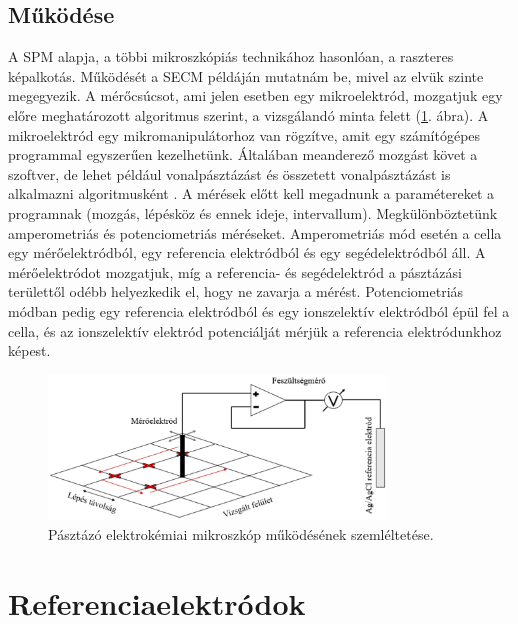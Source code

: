 \subsection{Működése}

A SPM alapja, a többi mikroszkópiás technikához hasonlóan, a raszteres képalkotás. Működését a SECM példáján mutatnám be, mivel az elvük szinte megegyezik. A mérőcsúcsot, ami jelen esetben egy mikroelektród, mozgatjuk egy előre meghatározott algoritmus szerint, a vizsgálandó minta felett (\ref{fig:PEKM}. ábra). A mikroelektród egy mikromanipulátorhoz van rögzítve, amit egy számítógépes programmal egyszerűen kezelhetünk. Általában meanderező mozgást követ a szoftver, de lehet például vonalpásztázást és összetett vonalpásztázást is alkalmazni algoritmusként \cite{kiss2014new}. A mérések előtt kell megadnunk a paramétereket a programnak (mozgás, lépésköz és ennek ideje, intervallum). Megkülönböztetünk amperometriás és potenciometriás méréseket. Amperometriás mód esetén a cella egy mérőelektródból, egy referencia elektródból és egy segédelektródból áll. A mérőelektródot mozgatjuk, míg a referencia- és segédelektród a pásztázási területtől odébb helyezkedik el, hogy ne zavarja a mérést. Potenciometriás módban pedig egy referencia elektródból és egy ionszelektív elektródból épül fel a cella, és az ionszelektív elektród potenciálját mérjük a referencia elektródunkhoz képest.

\begin{figure}
\centering
\includegraphics[width=0.8\textwidth]{img/spm.eps}
\caption{Pásztázó elektrokémiai mikroszkóp működésének szemléltetése.}
\label{fig:PEKM}
\end{figure}

\section{Referenciaelektródok}

